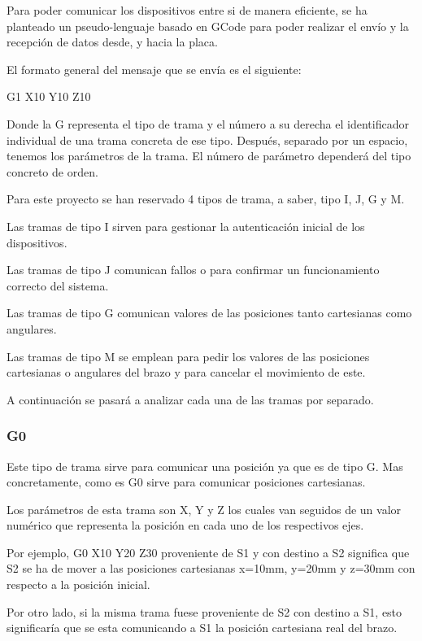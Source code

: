 Para poder comunicar los dispositivos entre si de manera eficiente, se ha planteado un pseudo-lenguaje basado en GCode para poder realizar el envío y la recepción de datos desde, y hacia la placa.

El formato general del mensaje que se envía es el siguiente:

\begin{center}
    {\Large G1 X10 Y10 Z10}
\end{center}

Donde la G representa el tipo de trama y el número a su derecha el identificador individual de una trama concreta de ese tipo.
Después, separado por un espacio, tenemos los parámetros de la trama. El número de parámetro dependerá del tipo concreto de orden.

Para este proyecto se han reservado 4 tipos de trama, a saber, tipo I, J, G y M.

Las tramas de tipo I sirven para gestionar la autenticación inicial de los dispositivos.

Las tramas de tipo J comunican fallos o para confirmar un funcionamiento correcto del sistema.

Las tramas de tipo G comunican valores de las posiciones tanto cartesianas como angulares.

Las tramas de tipo M se emplean para pedir los valores de las posiciones cartesianas o angulares del brazo y para cancelar el movimiento de este.

A continuación se pasará a analizar cada una de las tramas por separado.

\subsubsection{G0}
Este tipo de trama sirve para comunicar una posición ya que es de tipo G. Mas concretamente, como es G0 sirve para comunicar posiciones cartesianas.

Los parámetros de esta trama son X, Y y Z los cuales van seguidos de un valor numérico que representa la posición en cada uno de los respectivos ejes.

Por ejemplo, G0 X10 Y20 Z30 proveniente de \ac{S1} y con destino a \ac{S2} significa que \ac{S2} se ha de mover a las posiciones cartesianas x=10mm, y=20mm y z=30mm con respecto a la posición inicial.

Por otro lado, si la misma trama fuese proveniente de \ac{S2} con destino a \ac{S1}, esto significaría que se esta comunicando a \ac{S1} la posición cartesiana real del brazo.

